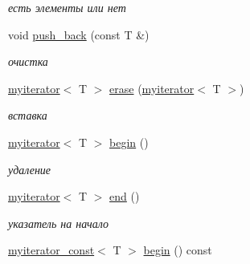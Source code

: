 \begin{DoxyCompactItemize}
\begin{DoxyCompactList}\small\item\em есть элементы или нет \end{DoxyCompactList}\item 
\hypertarget{classmyvector_a97243896431d4540f213fe80202e416d}{}void \hyperlink{classmyvector_a97243896431d4540f213fe80202e416d}{push\+\_\+back} (const T \&)\label{classmyvector_a97243896431d4540f213fe80202e416d}

\begin{DoxyCompactList}\small\item\em очистка \end{DoxyCompactList}\item 
\hypertarget{classmyvector_a4bf965fc88f4a853de0e3648451ae10e}{}\hyperlink{classmyiterator}{myiterator}$<$ T $>$ \hyperlink{classmyvector_a4bf965fc88f4a853de0e3648451ae10e}{erase} (\hyperlink{classmyiterator}{myiterator}$<$ T $>$)\label{classmyvector_a4bf965fc88f4a853de0e3648451ae10e}

\begin{DoxyCompactList}\small\item\em вставка \end{DoxyCompactList}\item 
\hypertarget{classmyvector_a7649a064046ae4c7cf2b2dbe44a28113}{}\hyperlink{classmyiterator}{myiterator}$<$ T $>$ \hyperlink{classmyvector_a7649a064046ae4c7cf2b2dbe44a28113}{begin} ()\label{classmyvector_a7649a064046ae4c7cf2b2dbe44a28113}

\begin{DoxyCompactList}\small\item\em удаление \end{DoxyCompactList}\item 
\hypertarget{classmyvector_aedd0ef2fd028fafd75671653d1e72eae}{}\hyperlink{classmyiterator}{myiterator}$<$ T $>$ \hyperlink{classmyvector_aedd0ef2fd028fafd75671653d1e72eae}{end} ()\label{classmyvector_aedd0ef2fd028fafd75671653d1e72eae}

\begin{DoxyCompactList}\small\item\em указатель на начало \end{DoxyCompactList}\item 
\hypertarget{classmyvector_ad58ce7d95f96a8fc7f5aac14cbea09b2}{}\hyperlink{classmyiterator__const}{myiterator\+\_\+const}$<$ T $>$ \hyperlink{classmyvector_ad58ce7d95f96a8fc7f5aac14cbea09b2}{begin} () const \label{classmyvector_ad58ce7d95f96a8fc7f5aac14cbea09b2}


\end{DoxyCompactItemize}
